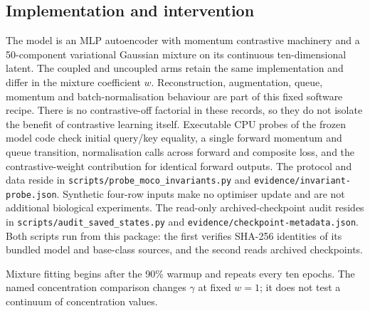 \documentclass[11pt]{article}
\begin{document}
\subsection{Implementation and intervention}
The model is an MLP autoencoder with momentum
contrastive machinery and a 50-component variational Gaussian mixture\cite{sklearn18bgm} on its
continuous ten-dimensional latent. The coupled and uncoupled arms retain
the same implementation and differ in the mixture coefficient $w$.
Reconstruction, augmentation, queue, momentum and batch-normalisation
behaviour are part of this fixed software recipe. There is no contrastive-off
factorial in these records, so they do not isolate the benefit of contrastive
learning itself.
Executable CPU probes of the frozen model code check initial query/key equality, a single forward momentum and queue transition, normalisation calls across forward and composite loss, and the contrastive-weight contribution for identical forward outputs. The protocol and data reside in \texttt{scripts/probe\_moco\_invariants.py} and \texttt{evidence/invariant-probe.json}. Synthetic four-row inputs make no optimiser update and are not additional biological experiments. The read-only archived-checkpoint audit resides in \texttt{scripts/audit\_saved\_states.py} and \texttt{evidence/checkpoint-metadata.json}. Both scripts run from this package: the first verifies SHA-256 identities of its bundled model and base-class sources, and the second reads archived checkpoints.

Mixture fitting begins after the 90\% warmup and repeats every ten epochs.
The named concentration comparison changes $\gamma$ at fixed $w=1$; it does
not test a continuum of concentration values.
\end{document}
